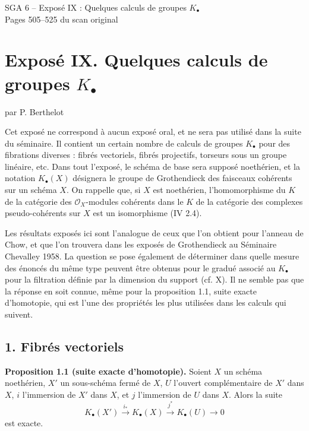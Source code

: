 \documentclass[11pt]{article}
\begin{document}
\begin{center}
{\Large SGA 6 -- Exposé IX : Quelques calculs de groupes $K_\bullet$}\\[0.4em]
{\large Pages 505--525 du scan original}\end{center}


\section*{Exposé IX. Quelques calculs de groupes $K_\bullet$}
\begin{center}
par P. Berthelot
\end{center}

Cet exposé ne correspond à aucun exposé oral, et ne sera pas utilisé dans la suite du séminaire. Il contient un certain nombre de calculs de groupes $K_\bullet$ pour des fibrations diverses : fibrés vectoriels, fibrés projectifs, torseurs sous un groupe linéaire, etc. Dans tout l'exposé, le schéma de base sera supposé noethérien, et la notation $K_\bullet(X)$ désignera le groupe de Grothendieck des faisceaux cohérents sur un schéma $X$. On rappelle que, si $X$ est noethérien, l'homomorphisme du $K$ de la catégorie des $\mathcal O_X$-modules cohérents dans le $K$ de la catégorie des complexes pseudo-cohérents sur $X$ est un isomorphisme (IV 2.4).

Les résultats exposés ici sont l'analogue de ceux que l'on obtient pour l'anneau de Chow, et que l'on trouvera dans les exposés de Grothendieck au Séminaire Chevalley 1958. La question se pose également de déterminer dans quelle mesure des énoncés du même type peuvent être obtenus pour le gradué associé au $K_\bullet$ pour la filtration définie par la dimension du support (cf. X). Il ne semble pas que la réponse en soit connue, même pour la proposition 1.1, suite exacte d'homotopie, qui est l'une des propriétés les plus utilisées dans les calculs qui suivent.

\subsection*{1. Fibrés vectoriels}

\textbf{Proposition 1.1 (suite exacte d'homotopie).} Soient $X$ un schéma noethérien, $X'$ un sous-schéma fermé de $X$, $U$ l'ouvert complémentaire de $X'$ dans $X$, $i$ l'immersion de $X'$ dans $X$, et $j$ l'immersion de $U$ dans $X$. Alors la suite
\[
K_\bullet(X')\xrightarrow{i_*}K_\bullet(X)\xrightarrow{j^*}K_\bullet(U)\longrightarrow 0
\]
est exacte.
\end{document}
